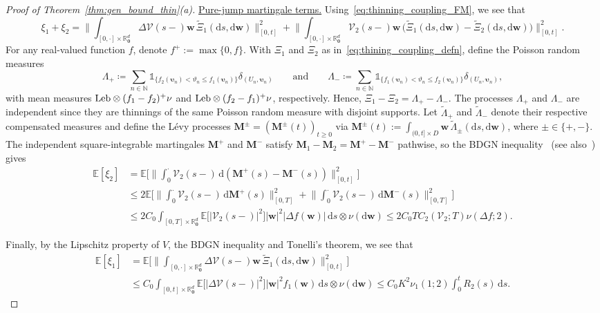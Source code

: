 \documentclass[en,oneside,bbfont,article]{amsart}
\theoremstyle{remark}
\theoremstyle{definition}
\theoremstyle{definition}
\newcommand\N{\mathbb{N}}
\newcommand{\V}{\bm{\mathcal{V}}}
\newcommand\R{\mathbb{R}}
\newcommand\E{\mathds{E}}
\newcommand\1{\mathds{1}}
\newcommand{\Leb}{\text{\normalfont Leb}}
\renewcommand\le{\leqslant}
\renewcommand\ge{\geqslant}
\newcommand{\D}{\mathrm{d}}
\newcommand{\wt}[1]{\widetilde{#1}}
\begin{document}
\begin{proof}[Proof of Theorem~\ref{thm:gen_bound_thin}(a)]
{\underline{Pure-jump martingale terms.}} 
Using~\eqref{eq:thinning_coupling_FM}, we see that
\begin{equation*}
\xi_{1}+\xi_{2}
= 
\bigg\|\int_{[0,\cdot]\times \R^d_{\bm0}}\!\!\Delta\V(s-)\bm{w}\,\wt{\Xi}_1(\D s, \D \bm{w}) \bigg\|_{[0,t]}^2
+
\bigg\|\int_{[0,\cdot]\times \R^d_{\bm0}}\!\!\V_2(s-)\bm{w}\, \big(\wt{\Xi}_1(\D s, \D \bm{w})-\wt{\Xi}_2(\D s, \D \bm{w}) \big)\bigg\|_{[0,t]}^2 .
\end{equation*} 
For any real-valued function $f$, denote $f^+:=\max\{0,f\}$. With $\Xi_1$ and $\Xi_2$ as in~\eqref{eq:thining_coupling_defn}, define the Poisson random measures 
\begin{equation*}
\Lambda_+\coloneqq\sum_{n\in\N} \1_{\{f_{2}(\bm{\upsilon}_n)<\vartheta_n\le f_{1}(\bm{\upsilon}_n)\}}\delta_{(U_n,\bm{\upsilon}_n)}
\qquad\text{and}\qquad
\Lambda_-\coloneqq\sum_{n\in\N} \1_{\{f_{1}(\bm{\upsilon}_n)<\vartheta_n\le f_{2}(\bm{\upsilon}_n)\}}\delta_{(U_n,\bm{\upsilon}_n)},
\end{equation*}
with mean measures $\Leb\otimes(f_{1}-f_{2})^+\nu$ and $\Leb\otimes(f_{2}-f_{1})^+\nu$, respectively. Hence, $\Xi_{1}-\Xi_{2}=\Lambda_+-\Lambda_-$. The processes $\Lambda_+$ and  $\Lambda_-$ are independent since they are thinnings of the same Poisson random measure with disjoint supports. Let $\wt\Lambda_+$ and $\wt\Lambda_-$ denote their respective compensated measures and define the L\'evy processes $\bm{M}^\pm=(\bm{M}^\pm(t))_{t\ge0}$ via $\bm{M}^\pm(t):=\int_{(0,t]\times D}\bm{w}\,\wt\Lambda_\pm(\D s,\D\bm{w})$, where $\pm\in\{+,-\}$. The independent square-integrable martingales $\bm{M}^+$ and $\bm{M}^-$ satisfy $\bm{M}_1-\bm{M}_2=\bm{M}^+-\bm{M}^-$ pathwise, so the BDGN inequality~\cite[Thm~1.1]{MR3463679} (see also~\cite[Thm~1(b)]{MR394861}) gives
\begin{align}
\E[\xi_{2}]
& =
\E \Bigg[\bigg\|\int_0^\cdot \V_2(s-) \,\D(\bm{M}^+(s)-\bm{M}^-(s))\bigg\|_{[0,t]}^2\Bigg]\nonumber\\
&\le
2\E \Bigg[\bigg\|\int_0^\cdot \V_2(s-) \,\D\bm{M}^+(s)\bigg\|_{[0,T]}^2
+\bigg\|\int_0^\cdot \V_2(s-) \,\D\bm{M}^-(s)\bigg\|_{[0,T]}^2\Bigg]\nonumber\\
& \le 2C_0\int_{[0,T]\times \R^d_{\bm0}} \E\big[|\V_2(s-)|^2\big] |\bm{w}|^2|\Delta f(\bm{w})| \,\D s \otimes \nu(\D\bm{w}) 
\le 2C_0 T C_2(\V_2;T) \nu(\Delta f;2).
\label{eq:bound_small_jumps_thinning_1_p<2}
\end{align} 

Finally, by the Lipschitz property of $V$, the BDGN inequality and Tonelli's theorem, we see that
\begin{align}
\E[\xi_{1}]
&= 
\E\Bigg[\bigg\|\int_{[0,\cdot]\times \R^d_{\bm0}}\!\!\Delta\V(s-)\bm{w}\,\wt{\Xi}_1(\D s, \D \bm{w}) \bigg\|_{[0,t]}^2 \Bigg]
\nonumber\\
&\le 
C_0 \int_{[0,t]\times \R^d_{\bm0}} \E\big[|\Delta\V(s-)|^2\big] |\bm{w}|^2f_1(\bm{w})\,\D s \otimes \nu(\D\bm{w})
\le C_0K^2 \nu_1(1;2)\int_0^t R_2(s)\,\D s.
\label{eq:bound_small_jumps_thinning_2_p<2}
\end{align}


\end{proof}
\end{document}

